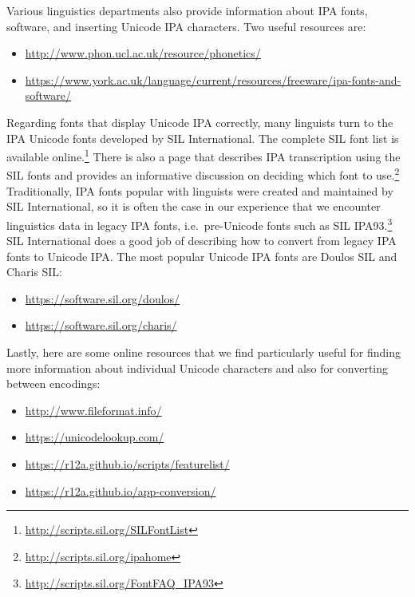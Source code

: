 \noindent Various linguistics departments also provide information about IPA fonts, software, and inserting Unicode IPA characters. Two useful resources are:

\begin{itemize}
	\item \url{http://www.phon.ucl.ac.uk/resource/phonetics/}
	\item \url{https://www.york.ac.uk/language/current/resources/freeware/ipa-fonts-and-software/}
\end{itemize}	

Regarding fonts that display Unicode IPA correctly, many linguists turn to the IPA Unicode fonts developed by SIL International. The complete SIL font list is available online.\footnote{\url{http://scripts.sil.org/SILFontList}} There is also a page that describes IPA transcription using the SIL fonts and provides an informative discussion on deciding which font to use.\footnote{\url{http://scripts.sil.org/ipahome}} Traditionally, IPA fonts popular with linguists were created and maintained by SIL International, so it is often the case in our experience that we encounter linguistics data in legacy IPA fonts, i.e.\ pre-Unicode fonts such as SIL IPA93.\footnote{\url{http://scripts.sil.org/FontFAQ_IPA93}} SIL International does a good job of describing how to convert from legacy IPA fonts to Unicode IPA. The most popular Unicode IPA fonts are Doulos SIL and Charis SIL:

\begin{itemize}
	\item \url{https://software.sil.org/doulos/}
	\item \url{https://software.sil.org/charis/}
\end{itemize}	

Lastly, here are some online resources that we find particularly useful for finding more information about individual Unicode characters and also for converting between encodings:

\begin{itemize}
	\item \url{http://www.fileformat.info/}
	\item \url{https://unicodelookup.com/}
	\item \url{https://r12a.github.io/scripts/featurelist/}
	\item \url{https://r12a.github.io/app-conversion/}
\end{itemize}


